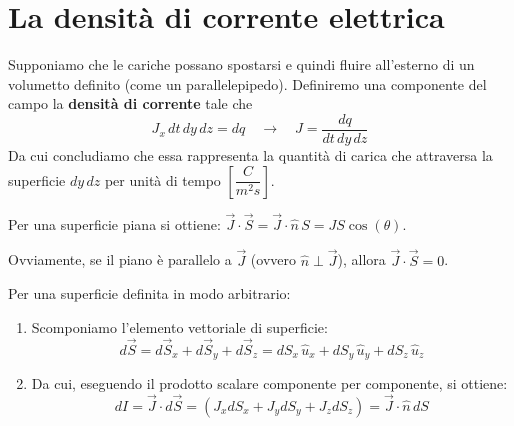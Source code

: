 \documentclass{book}
\begin{document}
\section{La densit\`a di corrente elettrica}
Supponiamo che le cariche possano spostarsi e quindi fluire all'esterno di un volumetto definito (come un parallelepipedo).
Definiremo una componente del campo la \textbf{densit\`a di corrente} tale che
\[
  J_x\, dt\, dy\, dz = dq \quad\rightarrow\quad J = \frac{dq}{dt\, dy\, dz}
\]
Da cui concludiamo che essa rappresenta la quantit\`a di carica che attraversa la superficie $dy\,dz$ per unit\`a di tempo $\left[\dfrac{C}{m^2s}\right]$.
\begin{center}
\end{center}
Per una superficie piana si ottiene: $\vec{J}\cdot\vec{S} = \vec{J}\cdot \hat{n}\, S = J S \cos(\theta)$.

Ovviamente, se il piano \`e parallelo a $\vec{J}$ (ovvero $\hat{n} \perp \vec{J}$), allora $\vec{J} \cdot \vec{S} = 0$.

Per una superficie definita in modo arbitrario:
\begin{enumerate}
  \item Scomponiamo l'elemento vettoriale di superficie:
  $$ d\vec{S} = d\vec{S}_x + d\vec{S}_y + d\vec{S}_z =  dS_x\,\hat{u}_x + dS_y\, \hat{u}_y + dS_z\, \hat{u}_z $$
  \item Da cui, eseguendo il prodotto scalare componente per componente, si ottiene:
  $$ dI = \vec{J} \cdot d\vec{S} = \left(J_x dS_x + J_y dS_y + J_z dS_z \right) = \vec{J} \cdot \hat{n}\, dS $$
\end{enumerate}
\end{document}
